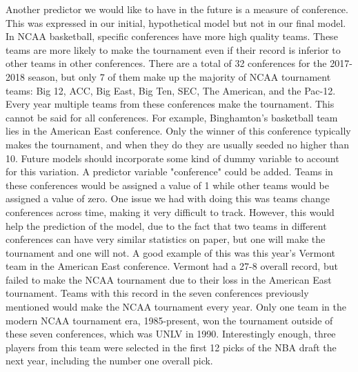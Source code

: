 \documentclass[]{scrartcl}
\begin{document}
Another predictor we would like to have in the future is a measure of conference. This was expressed in our initial, hypothetical model but not in our final model. In NCAA basketball, specific conferences have more high quality teams. These teams are more likely to make the tournament even if their record is inferior to other teams in other conferences. There are a total of 32 conferences for the 2017-2018 season, but only 7 of them make up the majority of NCAA tournament teams: Big 12, ACC, Big East, Big Ten, SEC, The American, and the Pac-12. Every  year multiple teams from these conferences make the tournament. This cannot be said for all conferences. For example, Binghamton's basketball team lies in the American East conference. Only the winner of this conference typically makes the tournament, and when they do they are usually seeded no higher than 10. Future models should incorporate some kind of dummy variable to account for this variation. A predictor variable "conference" could be added. Teams in these conferences would be assigned a value of 1 while other teams would be assigned a value of zero. One issue we had with doing this was teams change conferences across time, making it very difficult to track. However, this would help the prediction of the model, due to the fact that two teams in different conferences can have very similar statistics on paper, but one will make the tournament and one will not. A good example of this was this year's Vermont team in the American East conference. Vermont had a 27-8 overall record, but failed to make the NCAA tournament due to their loss in the American East tournament. Teams with this record in the seven conferences previously mentioned would make the NCAA tournament every year. Only one team in the modern NCAA tournament era, 1985-present, won the tournament outside of these seven conferences, which was UNLV in 1990. Interestingly enough, three players from this team were selected in the first 12 picks of the NBA draft the next year, including the number one overall pick.   
\end{document}
